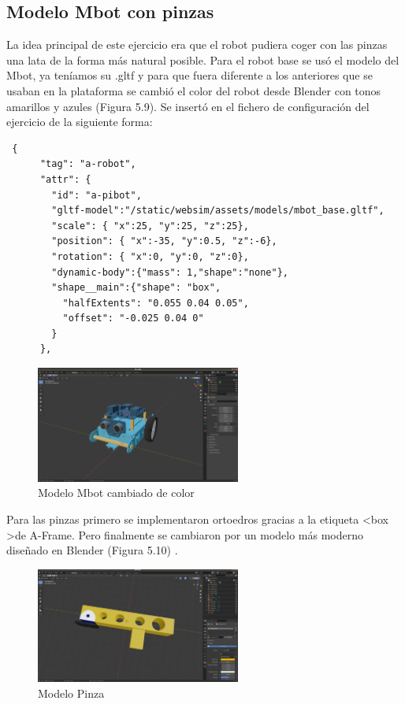 \subsection{Modelo Mbot con pinzas}
La idea principal de este ejercicio era que el robot pudiera coger con las pinzas una lata de la forma más natural posible.
Para el robot base se usó el modelo del Mbot, ya teníamos su  .gltf y para que fuera diferente a los anteriores que se usaban en la plataforma se cambió el color del robot desde Blender con tonos amarillos y azules (Figura 5.9). Se insertó en el fichero de configuración del ejercicio de la siguiente forma:

\begin{lstlisting}
 {
      "tag": "a-robot",
      "attr": {
        "id": "a-pibot",
        "gltf-model":"/static/websim/assets/models/mbot_base.gltf",
        "scale": { "x":25, "y":25, "z":25},
        "position": { "x":-35, "y":0.5, "z":-6},
        "rotation": { "x":0, "y":0, "z":0},
        "dynamic-body":{"mass": 1,"shape":"none"},
        "shape__main":{"shape": "box",
          "halfExtents": "0.055 0.04 0.05",
          "offset": "-0.025 0.04 0"
        }
      },
\end{lstlisting}

\begin{figure}[H]
  \centering
  \includegraphics[width=0.6\textwidth]{chapters/images/mbotbase.png}
	\caption{Modelo Mbot cambiado de color}  
\end{figure}


Para las pinzas  primero se implementaron ortoedros gracias a la etiqueta  \textless box \textgreater de A-Frame. Pero finalmente se cambiaron por un modelo más moderno diseñado en Blender (Figura 5.10) .

\begin{figure}[H]
  \centering
    \includegraphics[width=0.6\textwidth]{chapters/images/pinza.png}
	\caption{Modelo Pinza}    
\end{figure}


